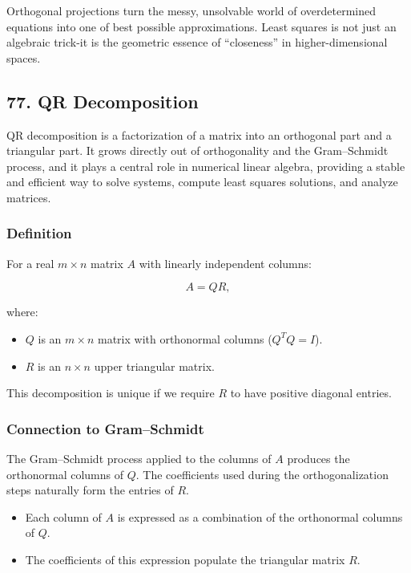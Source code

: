 \documentclass[
  letterpaper,
  DIV=11,
  numbers=noendperiod]{scrreprt}
\providecommand{\tightlist}{%
  \setlength{\itemsep}{0pt}\setlength{\parskip}{0pt}}
\begin{document}
Orthogonal projections turn the messy, unsolvable world of
overdetermined equations into one of best possible approximations. Least
squares is not just an algebraic trick-it is the geometric essence of
``closeness'' in higher-dimensional spaces.

\subsection{77. QR Decomposition}\label{qr-decomposition}

QR decomposition is a factorization of a matrix into an orthogonal part
and a triangular part. It grows directly out of orthogonality and the
Gram--Schmidt process, and it plays a central role in numerical linear
algebra, providing a stable and efficient way to solve systems, compute
least squares solutions, and analyze matrices.

\subsubsection{Definition}\label{definition-4}

For a real \(m \times n\) matrix \(A\) with linearly independent
columns:

\[
A = QR,
\]

where:

\begin{itemize}
\tightlist
\item
  \(Q\) is an \(m \times n\) matrix with orthonormal columns
  (\(Q^T Q = I\)).
\item
  \(R\) is an \(n \times n\) upper triangular matrix.
\end{itemize}

This decomposition is unique if we require \(R\) to have positive
diagonal entries.

\subsubsection{Connection to
Gram--Schmidt}\label{connection-to-gramschmidt}

The Gram--Schmidt process applied to the columns of \(A\) produces the
orthonormal columns of \(Q\). The coefficients used during the
orthogonalization steps naturally form the entries of \(R\).

\begin{itemize}
\tightlist
\item
  Each column of \(A\) is expressed as a combination of the orthonormal
  columns of \(Q\).
\item
  The coefficients of this expression populate the triangular matrix
  \(R\).
\end{itemize}
\end{document}
